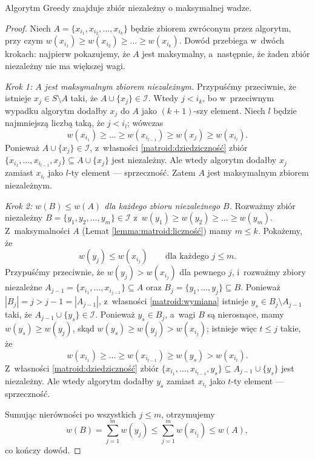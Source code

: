 \begin{theorem} \label{thm:rado-edmonds}
	Algorytm Greedy znajduje zbiór niezależny o maksymalnej wadze.
\end{theorem}
\begin{proof}
	Niech $A = \{x_{i_1}, x_{i_2}, \ldots, x_{i_k}\}$ będzie zbiorem zwróconym przez algorytm, przy czym $w(x_{i_1}) \geq w(x_{i_2}) \geq \ldots \geq w(x_{i_k})$. Dowód przebiega w~dwóch krokach: najpierw pokazujemy, że $A$ jest maksymalny, a~następnie, że żaden zbiór niezależny nie ma większej wagi.

	\emph{Krok 1: $A$ jest maksymalnym zbiorem niezależnym.}
	Przypuśćmy przeciwnie, że istnieje $x_j \in S \setminus A$ taki, że $A \cup \{x_j\} \in \mathcal{I}$. Wtedy $j < i_k$, bo w~przeciwnym wypadku algorytm dodałby $x_j$ do $A$ jako $(k+1)$-szy element. Niech $l$ będzie najmniejszą liczbą taką, że $j < i_l$; wówczas
	\[
		w(x_{i_1}) \geq \ldots \geq w(x_{i_{l-1}}) \geq w(x_j) \geq w(x_{i_l}).
	\]
	Ponieważ $A \cup \{x_j\} \in \mathcal{I}$, z~własności \ref{matroid:dziedziczność} zbiór $\{x_{i_1}, \ldots, x_{i_{l-1}}, x_j\} \subseteq A \cup \{x_j\}$ jest niezależny. Ale wtedy algorytm dodałby $x_j$ zamiast $x_{i_l}$ jako $l$-ty element --- sprzeczność. Zatem $A$ jest maksymalnym zbiorem niezależnym.

	\emph{Krok 2: $w(B) \leq w(A)$ dla każdego zbioru niezależnego $B$.}
	Rozważmy zbiór niezależny $B = \{y_1, y_2, \ldots, y_m\} \in \mathcal{I}$ z~$w(y_1) \geq w(y_2) \geq \ldots \geq w(y_m)$. Z~maksymalności $A$ (Lemat \ref{lemma:matroid:liczność}) mamy $m \leq k$. Pokażemy, że
	\[
		w(y_j) \leq w(x_{i_j}) \qquad \text{dla każdego } j \leq m.
	\]
	Przypuśćmy przeciwnie, że $w(y_j) > w(x_{i_j})$ dla pewnego $j$, i~rozważmy zbiory niezależne $A_{j-1} = \{x_{i_1}, \ldots, x_{i_{j-1}}\} \subseteq A$ oraz $B_j = \{y_1, \ldots, y_j\} \subseteq B$. Ponieważ $|B_j| = j > j-1 = |A_{j-1}|$, z~własności \ref{matroid:wymiana} istnieje $y_s \in B_j \setminus A_{j-1}$ taki, że $A_{j-1} \cup \{y_s\} \in \mathcal{I}$. Ponieważ $y_s \in B_j$, a~wagi $B$ są nierosnące, mamy $w(y_s) \geq w(y_j)$, skąd $w(y_s) \geq w(y_j) > w(x_{i_j})$; istnieje więc $t \leq j$ takie, że
	\[
		w(x_{i_1}) \geq \ldots \geq w(x_{i_{t-1}}) \geq w(y_s) > w(x_{i_t}).
	\]
	Z~własności \ref{matroid:dziedziczność} zbiór $\{x_{i_1}, \ldots, x_{i_{t-1}}, y_s\} \subseteq A_{j-1} \cup \{y_s\}$ jest niezależny. Ale wtedy algorytm dodałby $y_s$ zamiast $x_{i_t}$ jako $t$-ty element --- sprzeczność.

	Sumując nierówności po wszystkich $j \leq m$, otrzymujemy
	\[
		w(B) = \sum_{j=1}^{m} w(y_j) \leq \sum_{j=1}^{m} w(x_{i_j}) \leq w(A),
	\]
	co kończy dowód.
\end{proof}

